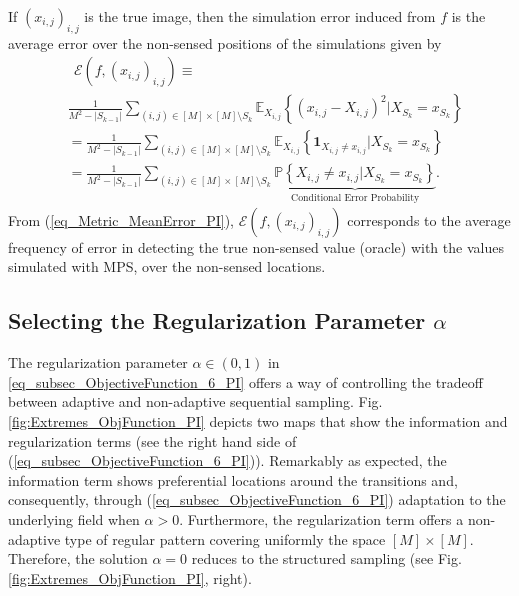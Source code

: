 If $(x_{i,j})_{i,j}$ is the true image, then the simulation error induced from $f$ is the average error over the non-sensed positions of the simulations given by
\begin{align}\label{eq_Metric_MeanError_PI}
	& \ \ \mathcal{E}(f, (x_{i,j})_{i,j}) \equiv \nonumber\\ 
	&\frac{1}{M^2-|S_{k-1}|}\sum_{(i,j) \in [M]\times [M] \setminus S_{k}}  \mathbb{E}_{X_{i,j}} \left\{  \left( x_{i,j}-  X_{i,j} \right)^2 | X_{S_{k}} = x_{S_{k}}  \right\} \nonumber\\ 
	&=\frac{1}{M^2-|S_{k-1}|}\sum_{(i,j) \in [M]\times [M] \setminus S_{k}} \mathbb{E}_{X_{i,j}} \left\{ \mathbf{1}_{X_{i,j} \neq x_{i,j}}  | X_{S_{k}} = x_{S_{k}}  \right\} \nonumber\\ 
	&=\frac{1}{M^2-|S_{k-1}|}\sum_{(i,j) \in [M]\times [M] \setminus S_{k}} \underbrace{\mathbb{P} \left\{{X_{i,j} \neq x_{i,j}}  | X_{S_{k}} = x_{S_{k}}  \right\}}_{\text{Conditional Error Probability}}.
\end{align}
From (\ref{eq_Metric_MeanError_PI}), $\mathcal{E}(f, (x_{i,j})_{i,j})$ corresponds to the average frequency of error in detecting the true non-sensed value (oracle) with the values simulated with MPS,  over the non-sensed locations.






\subsection{Selecting the Regularization Parameter \texorpdfstring{$\alpha$}{alpha}}
\label{sub_sec_alpha_selection_PI}

The regularization parameter $\alpha\in (0,1)$ in \eqref{eq_subsec_ObjectiveFunction_6_PI} offers a way of controlling the tradeoff between adaptive and non-adaptive sequential sampling. Fig. \ref{fig:Extremes_ObjFunction_PI} depicts two maps that show the information and regularization terms (see the right hand side of (\ref{eq_subsec_ObjectiveFunction_6_PI})). Remarkably as expected, the information term shows preferential locations around the transitions and, consequently, through (\ref{eq_subsec_ObjectiveFunction_6_PI}) adaptation to the underlying field when $\alpha>0$. Furthermore,  the regularization term offers a non-adaptive type of regular pattern covering uniformly the space $[M]\times [M]$. Therefore, the solution $\alpha=0$ reduces to the structured sampling (see Fig. \ref{fig:Extremes_ObjFunction_PI}, right).

